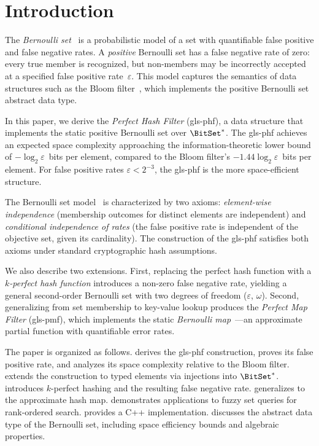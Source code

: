 \documentclass[ ../main.tex]{subfiles}
\begin{document}
\section{Introduction}

The \emph{Bernoulli set}~\cite{bsets} is a probabilistic model of a set with
quantifiable false positive and false negative rates. A \emph{positive}
Bernoulli set has a false negative rate of zero: every true member is
recognized, but non-members may be incorrectly accepted at a specified false
positive rate~$\varepsilon$. This model captures the semantics of data
structures such as the Bloom filter~\cite{bf}, which implements the positive
Bernoulli set abstract data type.

In this paper, we derive the \emph{Perfect Hash Filter} (\gls{gls-phf}), a
data structure that implements the static positive Bernoulli set over
$\BitSet^*$. The \gls{gls-phf} achieves an expected space complexity
approaching the information-theoretic lower bound of
$-\log_2 \varepsilon$~bits per element, compared to the Bloom filter's
$-1.44 \log_2 \varepsilon$~bits per element. For false positive rates
$\varepsilon < 2^{-3}$, the \gls{gls-phf} is the more space-efficient
structure.

The Bernoulli set model~\cite{bsets} is characterized by two axioms:
\emph{element-wise independence} (membership outcomes for distinct elements are
independent) and \emph{conditional independence of rates} (the false positive
rate is independent of the objective set, given its cardinality). The
construction of the \gls{gls-phf} satisfies both axioms under standard
cryptographic hash assumptions.

We also describe two extensions. First, replacing the perfect hash function with
a \emph{$k$-perfect hash function} introduces a non-zero false negative rate,
yielding a general second-order Bernoulli set with two degrees of freedom
($\varepsilon$, $\omega$). Second, generalizing from set membership to key-value
lookup produces the \emph{Perfect Map Filter} (\gls{gls-pmf}), which implements
the static \emph{Bernoulli map}~\cite{bmaps}---an approximate partial function
with quantifiable error rates.

The paper is organized as follows.
 derives the \gls{gls-phf} construction, proves its false
positive rate, and analyzes its space complexity relative to the Bloom filter.
 extends the construction to typed elements via injections
into $\BitSet^*$.
 introduces $k$-perfect hashing and the resulting false
negative rate.
 generalizes to the approximate hash map.
 demonstrates applications to fuzzy set queries for
rank-ordered search.
 provides a C++ implementation.
 discusses the abstract data type of the Bernoulli set, including
space efficiency bounds and algebraic properties.
\end{document}
